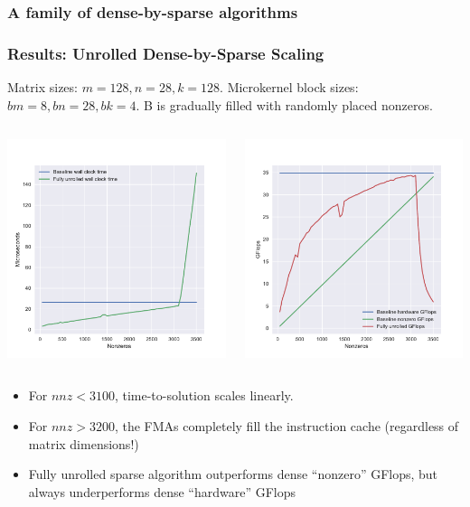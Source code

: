 \documentclass[9pt]{beamer}
\begin{document}
\begin{frame}
  \frametitle{A family of dense-by-sparse algorithms}
  
\end{frame}


\begin{frame}[fragile]
  \frametitle{Results: Unrolled Dense-by-Sparse Scaling}
  Matrix sizes: $m=128, n=28, k=128$.
  Microkernel block sizes: $bm=8, bn=28, bk=4$.
  B is gradually filled with randomly placed nonzeros.

  \begin{columns}[t]
    \begin{column}{0.6\textwidth}
      \centering
      \includegraphics[width=6.5cm]{images/unrolled_scaling_time.pdf}
    \end{column}
    \begin{column}{0.6\textwidth}
      \centering
      \includegraphics[width=6.5cm]{images/unrolled_scaling_flops.pdf}
    \end{column}
  \end{columns}

  \begin{itemize}
    \item For $nnz < 3100$, time-to-solution scales linearly.
    \item For $nnz > 3200$, the FMAs completely fill the instruction cache (regardless of matrix dimensions!)
    \item Fully unrolled sparse algorithm outperforms dense ``nonzero'' GFlops, but always underperforms dense ``hardware'' GFlops
    
  \end{itemize}
\end{frame}
\end{document}

